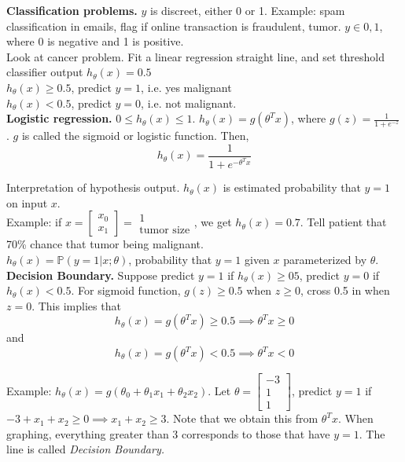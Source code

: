 \documentclass[a4 paper, 11 pt]{article}
\begin{document}
\textbf{Classification problems.} $y$ is discreet, either 0 or 1. Example: spam classification in emails, flag if online transaction is fraudulent, tumor. $y \in {0,1}$, where 0 is negative and 1 is positive.\\
Look at cancer problem. Fit a linear regression straight line, and set threshold classifier output $h_\theta(x) = 0.5$ \\
$h_\theta(x) \ge 0.5$, predict $y=1$, i.e. yes malignant \\
$h_\theta(x) < 0.5$, predict $y = 0$, i.e. not malignant. \\

\textbf{Logistic regression.} $0 \le h_\theta(x) \le 1.$ $\boxed{h_\theta(x) = g(\theta^T x)}$, where $g(z) = \frac{1}{1+ e^{-z}}$. $g$ is called the sigmoid or logistic function. Then,
\[
\boxed{h_\theta(x) = \frac{1}{1+e^{-\theta^Tx}}}
\]

Interpretation of hypothesis output. $h_\theta(x)$ is estimated probability that $y=1$ on input $x$. \\

Example: if $x = \begin{bmatrix} x_0 \\ x_1 \end{bmatrix} = \begin{matrix} 1 \\ \text{tumor size}\end{matrix}$, we get $h_\theta(x) = 0.7$. Tell patient that 70\% chance that tumor being malignant. \\

$\boxed{h_\theta(x) = \mathbb{P}(y=1 | x ; \theta)}$, probability that $y=1$ given $x$ parameterized by $\theta$.\\

\textbf{Decision Boundary.} Suppose predict $y=1$ if $h_\theta(x) \ge 05$, predict $y=0$ if $h_\theta(x) < 0.5$. For sigmoid function, $g(z) \ge 0.5$ when $z \ge 0$, cross 0.5 in when $z = 0$. This implies that
\[
h_\theta(x) = g(\theta^Tx) \ge 0.5 \implies \theta^Tx \ge 0
\]
and
\[
h_\theta(x) = g(\theta^Tx) < 0.5 \implies \theta^Tx <0
\]

Example:
$h_\theta(x) = g(\theta_0 + \theta_1 x_1 + \theta_2 x_2)$. Let $\theta = \begin{bmatrix}-3\\1\\1 \end{bmatrix}$, predict $y=1$ if $-3 + x_1 + x_2 \ge 0 \implies x_1 + x_2 \ge 3$. Note that we obtain this from $\theta^Tx$. When graphing, everything greater than 3 corresponds to those that have $y=1$. The line is called \textit{Decision Boundary.} 
\end{document}
